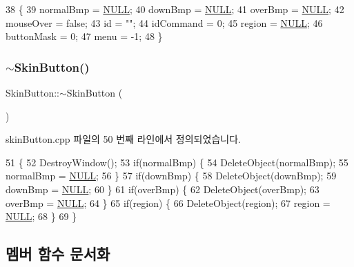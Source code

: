 \begin{DoxyCode}
38 \{
39   normalBmp = \mbox{\hyperlink{getopt1_8c_a070d2ce7b6bb7e5c05602aa8c308d0c4}{NULL}};
40   downBmp = \mbox{\hyperlink{getopt1_8c_a070d2ce7b6bb7e5c05602aa8c308d0c4}{NULL}};
41   overBmp = \mbox{\hyperlink{getopt1_8c_a070d2ce7b6bb7e5c05602aa8c308d0c4}{NULL}};
42   mouseOver = \textcolor{keyword}{false};
43   \textcolor{keywordtype}{id} = \textcolor{stringliteral}{""};
44   idCommand = 0;
45   region = \mbox{\hyperlink{getopt1_8c_a070d2ce7b6bb7e5c05602aa8c308d0c4}{NULL}};
46   buttonMask = 0;
47   menu = -1;
48 \}
\end{DoxyCode}
\mbox{\label{class_skin_button_ab91c10baa5bcb5f7c0303b8b4e2b2ed3}} 
\subsubsection{\texorpdfstring{$\sim$\+Skin\+Button()}{~SkinButton()}}
{\footnotesize\ttfamily Skin\+Button\+::$\sim$\+Skin\+Button (\begin{DoxyParamCaption}{ }\end{DoxyParamCaption})\hspace{0.3cm}{\ttfamily [virtual]}}



skin\+Button.\+cpp 파일의 50 번째 라인에서 정의되었습니다.


\begin{DoxyCode}
51 \{
52   DestroyWindow();
53   \textcolor{keywordflow}{if}(normalBmp) \{
54     DeleteObject(normalBmp);
55     normalBmp = \mbox{\hyperlink{getopt1_8c_a070d2ce7b6bb7e5c05602aa8c308d0c4}{NULL}};
56   \}
57   \textcolor{keywordflow}{if}(downBmp) \{
58     DeleteObject(downBmp);
59     downBmp = \mbox{\hyperlink{getopt1_8c_a070d2ce7b6bb7e5c05602aa8c308d0c4}{NULL}};
60   \}
61   \textcolor{keywordflow}{if}(overBmp) \{
62     DeleteObject(overBmp);
63     overBmp = \mbox{\hyperlink{getopt1_8c_a070d2ce7b6bb7e5c05602aa8c308d0c4}{NULL}};
64   \}
65   \textcolor{keywordflow}{if}(region) \{
66     DeleteObject(region);
67     region = \mbox{\hyperlink{getopt1_8c_a070d2ce7b6bb7e5c05602aa8c308d0c4}{NULL}};
68   \}
69 \}
\end{DoxyCode}


\subsection{멤버 함수 문서화}
\mbox{\label{class_skin_button_ad70dc6ed236a2274028c32744e3690bb}} 
